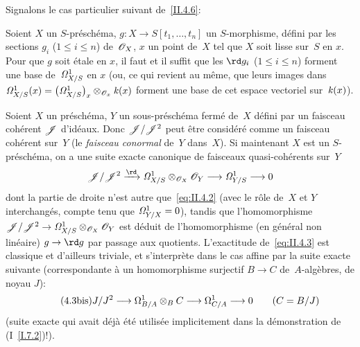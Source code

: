 Signalons le cas particulier suivant de~\ref{II.4.6}:
\begin{corollaire}
\label{II.4.8}
Soient $X$ un $S$-pr\'esch\'ema, $g\colon X\to
S[t_{1},\dots,t_{n}]$ un $S$-morphisme, d\'efini par les sections
$g_{i}$ ($1\le i\le n$) de~$\cal{O}_{X}$, $x$ un point de~$X$ tel que
$X$ soit lisse sur~$S$ en $x$. Pour que $g$ soit \'etale en $x$, il
faut et il suffit que les $\rd g_{i}$
($1\le i\le n$) forment une base de~$\it{\Omega}^1_{X/S}$ en $x$ (ou,
ce qui revient au m\^eme, que leurs images dans
$\it{\Omega}^1_{X/S}(x) =
\big(\it{\Omega}^1_{X/S}\big)_{x}\otimes_{\cal{O}_{x}}\kres(x)$ forment
une base de cet espace vectoriel sur~$\kres(x)$).
\end{corollaire}

Soient $X$ un pr\'esch\'ema, $Y$ un sous-pr\'esch\'ema
ferm\'e de~$X$ d\'efini par un faisceau coh\'erent $\cal{J}$
d'id\'eaux. Donc $\cal{J}/\cal{J}^2$ peut \^etre consid\'er\'e
comme un faisceau coh\'erent sur~$Y$ (le \emph{faisceau conormal}
de~$Y$ dans~$X$). Si maintenant $X$ est un $S$-pr\'esch\'ema, on a
une suite exacte canonique de faisceaux quasi-coh\'erents sur~$Y$
\begin{equation}
\label{eq:II.4.3}
{\cal{J}/\cal{J}^2\lto{\rd}
\it{\Omega}^1_{X/S}\otimes_{\cal{O}_{X}}\cal{O}_{Y}\to
\it{\Omega}^1_{Y/S}\to 0}
\end{equation}
dont la partie de droite n'est autre que~\eqref{eq:II.4.2} (avec le
r\^ole de~$X$ et $Y$ interchang\'es, compte tenu que
$\it{\Omega}^1_{Y/X}=0$), tandis que l'homomorphisme
$\cal{J}/\cal{J}^2\to\it{\Omega}^1_{X/S}\otimes_{\cal{O}_{X}}\cal{O}_{Y}$
est d\'eduit de l'homomorphisme (en g\'en\'eral non
lin\'eaire) $g\to\rd g$ par passage aux
quotients. L'exactitude de~\eqref{eq:II.4.3} est classique et
d'ailleurs triviale, et s'interpr\`ete dans le cas affine par la
suite exacte suivante (correspondante \`a un homomorphisme surjectif
$B\to C$ de~$A$-alg\`ebres, de noyau $J$):
\begin{equation*}
\label{eq:II.4.3bis}
\tag{4.3\textrm{bis}}
{J/J^2\to\Omega^1_{B/A}\otimes_{B}C\to\Omega^1_{C/A}\to 0\qquad
(C=B/J)}
\end{equation*}
(suite exacte qui avait d\'ej\`a \'et\'e utilis\'ee
implicitement dans la d\'emonstration de (I~\ref{I.7.2})!).

